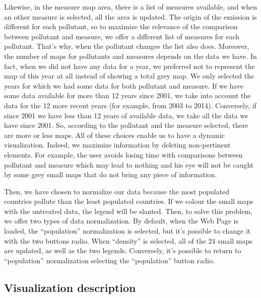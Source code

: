 \documentclass[preprint,journal]{vgtc}       %
\begin{document}
Likewise, in the measure map area, there is a list of measures available, and when an other measure is selected, all the area is updated. The origin of the emission is different for each pollutant, so to maximize the relevance of the comparison between pollutant and measure, we offer a different list of measures for each pollutant. That’s why, when the pollutant changes the list also does. 
Moreover, the number of maps for pollutants and measures depends on the data we have. In fact, when we did not have any data for a year, we preferred not to represent the map of this year at all instead of showing a total grey map. We only selected the years for which we had some data for both pollutant and measure. If we have some data available for more than 12 years since 2001, we take into account the data for the 12 more recent years (for example, from 2003 to 2014). Conversely, if since 2001 we have less than 12 years of available data, we take all the data we have since 2001. So, according to the pollutant and the measure selected, there are more or less maps.
All of these choices enable us to have a dynamic visualization. Indeed, we maximize information by deleting non-pertinent elements. For example, the user avoids losing time with comparisons between pollutant and measure which may lead to nothing and his eye will not be caught by some grey small maps that do not bring any piece of information.

Then, we have chosen to normalize our data because the most populated countries pollute than the least populated countries. If we colour the small maps with the untreated data, the legend will be slanted. Then, to solve this problem, we offer two types of data normalization. By default, when the Web Page is loaded, the “population” normalization is selected, but it’s possible to change it with the two buttons radio. When “density” is selected, all of the 24 small maps are updated, as well as the two legends. Conversely, it’s possible to return to “population” normalization selecting the “population” button radio. 
	\subsection{Visualization description}
	
\end{document}
